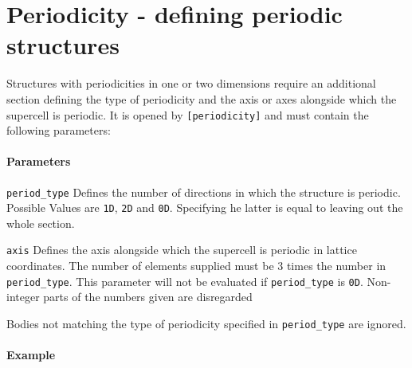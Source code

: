 \section{Periodicity - defining periodic structures}
Structures with periodicities in one or two dimensions require an additional section defining the type of periodicity and the axis or axes alongside which the supercell is periodic. It is opened by \lstinline{[periodicity]} and must contain the following parameters:

\paragraph{Parameters}
\begin{description}
 \item{\lstinline{period_type}} Defines the number of directions in which the structure is periodic. Possible Values are \lstinline{1D}, \lstinline{2D} and \lstinline{0D}. Specifying he latter is equal to leaving out the whole section.
 \item{\lstinline{axis}} Defines the axis alongside which the supercell is periodic in lattice coordinates. The number of elements supplied must be 3 times the number in \lstinline{period_type}. This parameter will not be evaluated if \lstinline{period_type} is \lstinline{0D}. Non-integer parts of the numbers given are disregarded
\end{description}

Bodies not matching the type of periodicity specified in \lstinline{period_type} are ignored.

\paragraph{Example}\ 



